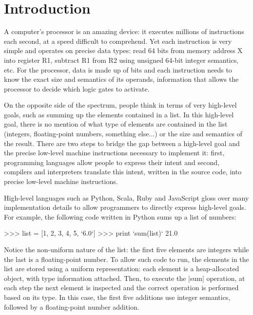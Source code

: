 \chapter{Introduction}
\label{chapter:intro}

A computer's processor is an amazing device: it executes millions of instructions each second, at a speed difficult to comprehend. Yet each instruction is very simple and operates on precise data types: read 64 bits from memory address X into register R1, subtract R1 from R2 using unsigned 64-bit integer semantics, etc. For the processor, data is made up of bits and each instruction needs to know the exact size and semantics of its operands, information that allows the processor to decide which logic gates to activate.

On the opposite side of the spectrum, people think in terms of very high-level goals, such as summing up the elements contained in a list. In this high-level goal, there is no mention of what type of elements are contained in the list (integers, floating-point numbers, something else...) or the size and semantics of the result. There are two steps to bridge the gap between a high-level goal and the precise low-level machine instructions necessary to implement it: first, programming languages allow people to express their intent and second, compilers and interpreters translate this intent, written in the source code, into precise low-level machine instructions.

High-level languages such as Python, Scala, Ruby and JavaScript gloss over many implementation details to allow programmers to directly express high-level goals. For example, the following code written in Python sums up a list of numbers:

\begin{lstlisting-nobreak}
 >>> list = [1, 2, 3, 4, 5, `6.0`]
 >>> print `sum(list)`
 21.0
\end{lstlisting-nobreak}

Notice the non-uniform nature of the list: the first five elements are integers while the last is a floating-point number. To allow such code to run, the elements in the list are stored using a uniform representation: each element is a heap-allocated object, with type information attached. Then, to execute the |sum| operation, at each step the next element is inspected and the correct operation is performed based on its type. In this case, the first five additions use integer semantics, followed by a floating-point number addition. %

